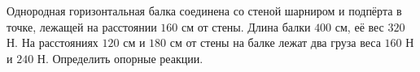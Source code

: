 Однородная горизонтальная балка соединена со стеной шарниром и подпёрта
в точке, лежащей на расстоянии $160$ см от стены. Длина балки $400$ см,
её вес $320$ Н. На расстояниях $120$ см и $180$ см от стены на балке
лежат два груза веса $160$ Н и $240$ Н. Определить опорные реакции.
